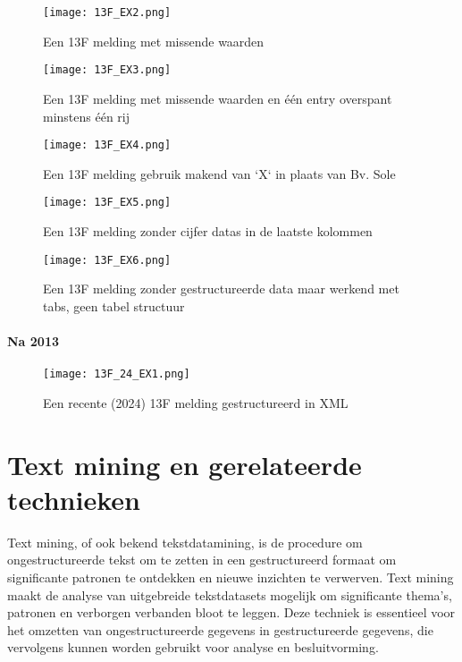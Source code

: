 \begin{figure}[hbt!]
    \texttt{[image: 13F\_EX2.png]}
    \caption[13F voorbeeld 3]{\label{fig:voorbeeld 2}Een 13F melding met missende waarden}
\end{figure}
\begin{figure}[hbt!]
    \texttt{[image: 13F\_EX3.png]}
    \caption[13F voorbeeld 4]{\label{fig:voorbeeld 3}Een 13F melding met missende waarden en één entry overspant minstens één rij}
\end{figure}

\begin{figure}[hbt!]
    \texttt{[image: 13F\_EX4.png]}
    \caption[13F voorbeeld 5]{\label{fig:voorbeeld 4}Een 13F melding gebruik makend van `X` in plaats van Bv. Sole}
\end{figure}

\begin{figure}[hbt!]
    \texttt{[image: 13F\_EX5.png]}
    \caption[13F voorbeeld 6]{\label{fig:voorbeeld 5}Een 13F melding zonder cijfer datas in de laatste kolommen}
\end{figure}

\begin{figure}[hbt!]
    \texttt{[image: 13F\_EX6.png]}
    \caption[13F voorbeeld 7]{\label{fig:voorbeeld 6}Een 13F melding zonder gestructureerde data maar werkend met tabs, geen tabel structuur}
\end{figure}
\paragraph{Na 2013}

\begin{figure}[hbt!]
    \texttt{[image: 13F\_24\_EX1.png]}
    \caption[13F voorbeeld 7]{\label{fig:voorbeeld 2024 1}Een recente (2024) 13F melding gestructureerd in XML}
\end{figure}


\section{Text mining en gerelateerde technieken}
Text mining, of ook bekend tekstdatamining, is de procedure om ongestructureerde tekst om te zetten in een gestructureerd formaat om significante patronen te ontdekken en nieuwe inzichten te verwerven. Text mining maakt de analyse van uitgebreide tekstdatasets mogelijk om significante thema's, patronen en verborgen verbanden bloot te leggen. Deze techniek is essentieel voor het omzetten van ongestructureerde gegevens in gestructureerde gegevens, die vervolgens kunnen worden gebruikt voor analyse en besluitvorming\autocite{IBM2024}.

